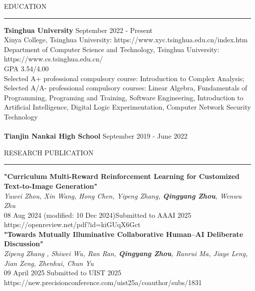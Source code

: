 \documentclass{resume} %
\renewenvironment{rSection}[1]{
\sectionskip
\textcolor{TsinghuaPurple}{\MakeUppercase{#1}}
\sectionlineskip
\hrule
\begin{list}{}{
\setlength{\leftmargin}{0em}
}
\item[]
}{
\end{list}
}
\begin{document}
  


\begin{rSection}{Education}

{\bf Tsinghua University} \hfill
{September 2022 - Present}\\ 
Xinya College, Tsinghua University: https://www.xyc.tsinghua.edu.cn/index.htm
\\
Department of Computer Science and Technology, Tsinghua University: https://www.cs.tsinghua.edu.cn/
\\
GPA 3.54/4.00
\\
Selected A+ professional compulsory course: Introduction to Complex Analysis; \\
Selected A/A- professional compulsory courses: Linear Algebra, Fundamentals of Programming, Programing and Training, Software Engineering, 	Introduction to Artificial Intelligence, Digital Logic Experimentation, Computer Network Security Technology\\
\\
{\bf Tianjin Nankai High School} \hfill
{September 2019 - June 2022}


\end{rSection} 

\begin{rSection}{ Research Publication } \itemsep -3pt        
{\textbf{"Curriculum Multi-Reward Reinforcement Learning for Customized Text-to-Image Generation"}\\
 \textit{Yuwei Zhou, Xin Wang, Hong Chen, Yipeng Zhang, \textbf{Qingyang Zhou}, Wenwu Zhu }\\
 08 Aug 2024 (modified: 10 Dec 2024)Submitted to AAAI 2025}\\
 https://openreview.net/pdf?id=kiGUqX6Gct\\

 {\textbf{"Towards Mutually Illuminative Collaborative Human–AI Deliberate Discussion"}\\
 \textit{Zipeng Zhang , Shiwei Wu, Ran Ran, \textbf{Qingyang Zhou}, Ranrui Ma, Jiaye Leng, Jian Zeng, Zhenhui, Chun Yu }\\
 09 April 2025 Submitted to UIST 2025}\\
 https://new.precisionconference.com/uist25a/coauthor/subs/1831\\
 
\end{rSection}
\end{document}
